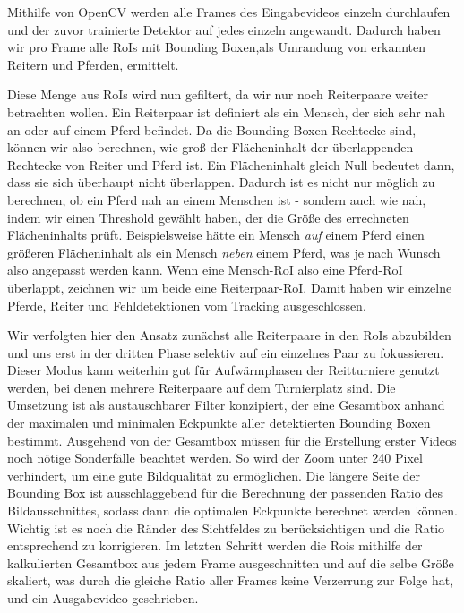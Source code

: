 Mithilfe von OpenCV werden alle Frames des Eingabevideos einzeln durchlaufen und der zuvor trainierte Detektor auf jedes einzeln angewandt. Dadurch haben wir pro Frame alle RoIs mit Bounding Boxen,als Umrandung von erkannten Reitern und Pferden, ermittelt. 

Diese Menge aus RoIs wird nun  gefiltert, da wir nur noch Reiterpaare weiter betrachten wollen. Ein Reiterpaar ist definiert als ein Mensch, der sich sehr nah an oder auf einem Pferd befindet.
Da die Bounding Boxen Rechtecke sind, können wir also berechnen, wie groß der Flächeninhalt der überlappenden Rechtecke von Reiter und Pferd ist. Ein Flächeninhalt gleich Null bedeutet dann, dass sie sich überhaupt nicht überlappen.
Dadurch ist es nicht nur möglich zu berechnen, ob ein Pferd nah an einem Menschen ist - sondern auch wie nah, indem wir einen Threshold gewählt haben, der die Größe des errechneten Flächeninhalts prüft. Beispielsweise hätte ein Mensch \emph{auf} einem Pferd einen größeren Flächeninhalt als ein Mensch \emph{neben} einem Pferd, was je nach Wunsch also angepasst werden kann.
Wenn eine Mensch-RoI also eine Pferd-RoI überlappt, zeichnen wir um beide eine Reiterpaar-RoI. Damit haben wir einzelne Pferde, Reiter und Fehldetektionen vom Tracking ausgeschlossen.

Wir verfolgten hier den Ansatz zunächst alle Reiterpaare in den RoIs abzubilden und uns erst in der dritten Phase selektiv auf ein einzelnes Paar zu fokussieren. Dieser Modus kann weiterhin gut für Aufwärmphasen der Reitturniere genutzt werden, bei denen mehrere Reiterpaare auf dem Turnierplatz sind. Die Umsetzung ist als austauschbarer Filter konzipiert, der eine Gesamtbox anhand der maximalen und minimalen Eckpunkte aller detektierten Bounding Boxen bestimmt.
Ausgehend von der Gesamtbox müssen für die Erstellung erster Videos noch nötige Sonderfälle beachtet werden. So wird der Zoom unter 240 Pixel verhindert, um eine gute Bildqualität zu ermöglichen. Die längere Seite der Bounding Box ist ausschlaggebend für die Berechnung der passenden Ratio des Bildausschnittes, sodass dann die optimalen  Eckpunkte berechnet werden können. Wichtig ist es noch die Ränder des Sichtfeldes zu berücksichtigen und die Ratio entsprechend zu korrigieren.
Im letzten Schritt werden die Rois mithilfe der kalkulierten Gesamtbox aus jedem Frame ausgeschnitten und auf die selbe Größe skaliert, was durch die gleiche Ratio aller Frames keine Verzerrung zur Folge hat, und ein Ausgabevideo geschrieben.





